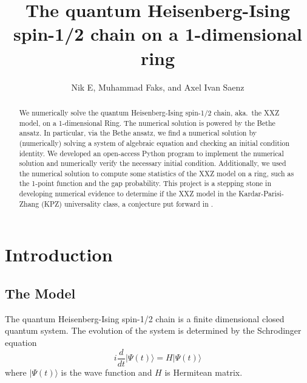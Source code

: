 \documentclass[11pt]{article}
\numberwithin{equation}{section}
\theoremstyle{plain}
\theoremstyle{plain}
\theoremstyle{definition}
\begin{document}
\title{\vspace{-8ex} The quantum Heisenberg-Ising spin-1/2 chain on a 1-dimensional ring}

\author{Nik E, Muhammad Faks, and Axel Ivan Saenz}


\date{}

\maketitle

\begin{abstract}
  We numerically solve the quantum Heisenberg-Ising spin-1/2 chain, aka.~the XXZ model, on a 1-dimensional Ring. The numerical solution is powered by the Bethe ansatz. In particular, via the Bethe ansatz, we find a numerical solution by (numerically) solving a system of algebraic equation and checking an initial condition identity. We developed an open-access Python program to implement the numerical solution and numerically verify the necessary initial condition. Additionally, we used the numerical solution to compute some statistics of the XXZ model on a ring, such as the 1-point function and the gap probability. This project is a stepping stone in developing numerical evidence to determine if the XXZ model in the Kardar-Parisi-Zhang (KPZ) universality class, a conjecture put forward in \cite{STW22}.
\end{abstract}






\section{Introduction}

\subsection{The Model}

The quantum Heisenberg-Ising spin-1/2 chain is a finite dimensional closed quantum system. The evolution of the system is determined by the Schrodinger equation
\begin{equation}
    i\frac{d}{dt} | \Psi (t) \rangle = H  | \Psi (t) \rangle
\end{equation}
where $| \Psi (t) \rangle$ is the wave function and $H$ is Hermitean matrix.
\end{document}
